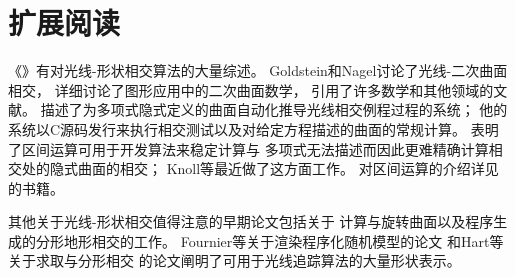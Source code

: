 \section{扩展阅读}\label{sec:扩展阅读03}
《》有对光线-形状相交算法的大量综述\citep{10.5555/94788}。
Goldstein和Nagel\parencite*{doi:10.1177/003754977101600104}讨论了光线-二次曲面相交，
\citet{Heckbert84themathematics}详细讨论了图形应用中的二次曲面数学，
引用了许多数学和其他领域的文献。
\citet{10.1145/964967.801136}描述了为多项式隐式定义的曲面自动化推导光线相交例程过程的系统；
他的系统以C源码发行来执行相交测试以及对给定方程描述的曲面的常规计算。
\citet{10.5555/93267.93276}表明了区间运算可用于开发算法来稳定计算与
多项式无法描述而因此更难精确计算相交处的隐式曲面的相交；
Knoll等\parencite*{10.1111/j.1467-8659.2008.01189.x}最近做了这方面工作。
对区间运算的介绍详见\citet{moore1966interval}的书籍。

其他关于光线-形状相交值得注意的早期论文包括\citet{10.1145/800059.801137}关于
计算与旋转曲面以及程序生成的分形地形相交的工作。
Fournier等\parencite*{10.1145/358523.358553}关于渲染程序化随机模型的论文
和Hart等\parencite*{10.1145/74334.74363}关于求取与分形相交
的论文阐明了可用于光线追踪算法的大量形状表示。